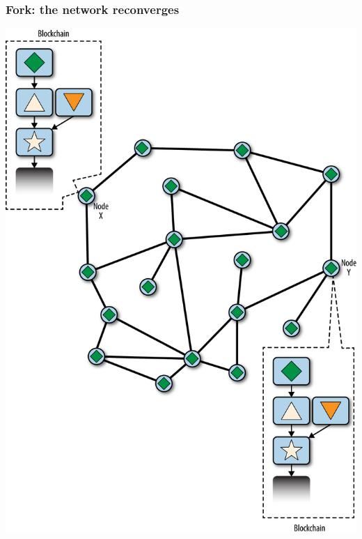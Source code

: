 \documentclass[11pt]{beamer}  %
\begin{document}
\begin{frame}\frametitle{Fork: the network reconverges}

  \begin{center}
    \includegraphics[scale=0.47,clip=false]{pictures/mbc2_1006.png}
  \end{center}

\end{frame}
\end{document}

